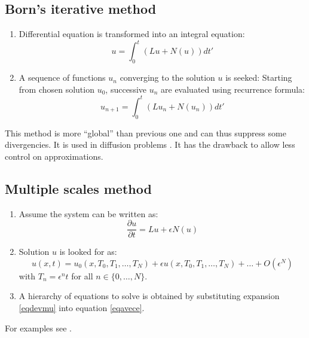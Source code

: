 \documentclass[12pt]{book}
\begin{document}
\subsection{Born's iterative method}
\begin{alg}
\begin{enumerate}
\item Differential equation is transformed into an integral equation:
\begin{equation}
u=\int_0^t(Lu+N(u))dt'
\end{equation}
\item A sequence of functions $u_n$ converging to the solution $u$ is seeked: 
Starting from chosen solution $u_0$, successive
$u_n$ are evaluated using recurrence formula:
\begin{equation}
u_{n+1}=\int_0^t(Lu_n+N(u_n))dt'
\end{equation}
\end{enumerate}
\end{alg}
This method is more ``global'' than previous one 
 and can thus suppress some
divergencies. It is used in diffusion problems
\cite{ph:mecaq:Cohen73,ph:mecaq:Cohen88}.  It has the drawback to allow less
control on approximations.
\subsection{Multiple scales method}
\begin{alg}
\begin{enumerate}
\item Assume the system can be written as:
\begin{equation}\label{eqavece}
\frac{\partial u}{\partial t}=Lu+\epsilon N(u)
\end{equation}
\item Solution $u$ is looked for as:
\begin{equation}\label{eqdevmu}
u(x,t)=u_0(x,T_0,T_1,\dots,T_N)+\epsilon
u(x,T_0,T_1,\dots,T_N)+\dots+O(\epsilon^N) 
\end{equation}
with $T_n=\epsilon^n t$ for all $n\in \{0,\dots,N\}$.
\item A hierarchy of equations to solve is obtained by substituting
expansion \ref{eqdevmu} into equation \ref{eqavece}. 
\end{enumerate}
\end{alg}
For examples see \cite{ma:equad:Nayfeh95}.
\end{document}

